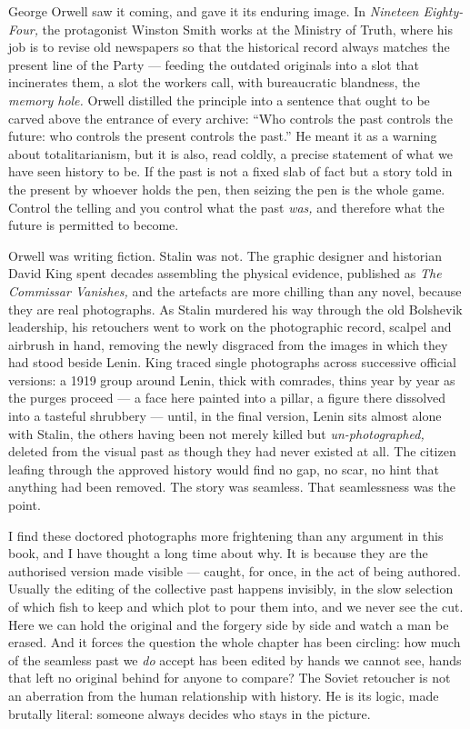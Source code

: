 George Orwell saw it coming, and gave it its enduring image. In \emph{Nineteen Eighty-Four,} the protagonist Winston Smith works at the Ministry of Truth, where his job is to revise old newspapers so that the historical record always matches the present line of the Party — feeding the outdated originals into a slot that incinerates them, a slot the workers call, with bureaucratic blandness, the \emph{memory hole.} Orwell distilled the principle into a sentence that ought to be carved above the entrance of every archive: ``Who controls the past controls the future: who controls the present controls the past.'' He meant it as a warning about totalitarianism, but it is also, read coldly, a precise statement of what we have seen history to be. If the past is not a fixed slab of fact but a story told in the present by whoever holds the pen, then seizing the pen is the whole game. Control the telling and you control what the past \emph{was,} and therefore what the future is permitted to become.

Orwell was writing fiction. Stalin was not. The graphic designer and historian David King spent decades assembling the physical evidence, published as \emph{The Commissar Vanishes,} and the artefacts are more chilling than any novel, because they are real photographs. As Stalin murdered his way through the old Bolshevik leadership, his retouchers went to work on the photographic record, scalpel and airbrush in hand, removing the newly disgraced from the images in which they had stood beside Lenin. King traced single photographs across successive official versions: a 1919 group around Lenin, thick with comrades, thins year by year as the purges proceed — a face here painted into a pillar, a figure there dissolved into a tasteful shrubbery — until, in the final version, Lenin sits almost alone with Stalin, the others having been not merely killed but \emph{un-photographed,} deleted from the visual past as though they had never existed at all. The citizen leafing through the approved history would find no gap, no scar, no hint that anything had been removed. The story was seamless. That seamlessness was the point.

I find these doctored photographs more frightening than any argument in this book, and I have thought a long time about why. It is because they are the authorised version made visible — caught, for once, in the act of being authored. Usually the editing of the collective past happens invisibly, in the slow selection of which fish to keep and which plot to pour them into, and we never see the cut. Here we can hold the original and the forgery side by side and watch a man be erased. And it forces the question the whole chapter has been circling: how much of the seamless past we \emph{do} accept has been edited by hands we cannot see, hands that left no original behind for anyone to compare? The Soviet retoucher is not an aberration from the human relationship with history. He is its logic, made brutally literal: someone always decides who stays in the picture.

